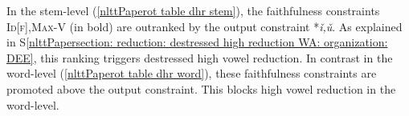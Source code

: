 In the stem-level (\ref{nlttPaperot table dhr stem}), the faithfulness constraints {\textsc{ Id[f]}},{\textsc{Max-V}} (in bold) are outranked by the output constraint *\textit{\v{i},\v{u}}. As explained in S\ref{nlttPapersection: reduction: destressed high reduction WA: organization: DEE}, this ranking triggers destressed high vowel reduction. In contrast in the word-level (\ref{nlttPaperot table dhr word}), these faithfulness constraints are promoted above the output constraint. This blocks high vowel reduction in the word-level.






			
			
				
				
			
			
